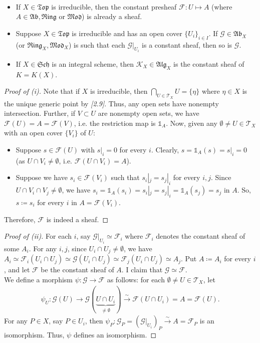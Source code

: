 \documentclass[11pt,a4paper,footinclude=true,headinclude=true]{scrbook} %
\newcommand{\FF}{\mathscr{F}}
\newcommand{\GG}{\mathscr{G}}
\newcommand{\KK}{\mathscr{K}}
\newcommand{\TT}{\mathcal{T}}
\newcommand{\Sch}{\mathfrak{Sch}}
\newcommand{\Ab}{\mathfrak{Ab}}
\newcommand{\Ring}{\mathfrak{Ring}}
\newcommand{\Top}{\mathfrak{Top}}
\newcommand{\<}{\langle}
\newcommand{\>}{\rangle}
\newcommand{\isoto}{\overset{\sim}{\to}}
\newcommand{\isolongto}{\overset{\sim}{\longrightarrow}}
\newcommand{\MOD}{\mathfrak{Mod}}
\newcommand{\ALG}{\mathfrak{Alg}}
\newenvironment{proposition}[2][]
{\renewcommand\theinnercustomprop{#2}\innercustomprop[#1] 
\begin{mdframed}[backgroundcolor=gray!20]\ }
{\end{mdframed}\endinnercustomprop}
\begin{document}
\begin{proposition}{6.C}
    \begin{itemize}
        \item[(i)] If $X\in\Top$ is irreducible, then the constant presheaf $\FF:U\mapsto A$ (where $A\in\Ab,\Ring$ or $\MOD$) is already a sheaf.
        \item[(ii)] Suppose $X\in\Top$ is irreducible and has an open cover $\{U_i\}_{i\in I}$. If $\GG\in\Ab_X$ (or $\Ring_X,\MOD_X$) is such that each $\GG|_{U_i}$ is a constant sheaf, then so is $\GG$.
        \item[(iii)] If $X\in\Sch$ is an integral scheme, then $\KK_X\in\ALG_X$ is the constant sheaf of $K=K(X)$. 
    \end{itemize}
\end{proposition}
\begin{proof}[Proof of (i)]
    Note that if $X$ is irreducible, then $\bigcap_{U\in\TT_X}U=\{\eta\}$ where $\eta\in X$ is the unique generic point by \textit{[2.9]}. Thus, any open sets have nonempty intersection. Further, if $V\subset U$ are nonempty open sets, we have $\FF(U)=A=\FF(V)$, i.e. the restriction map is $\mathds{1}_A$. Now, given any $\emptyset\neq U\in\TT_X$ with an open cover $\{V_i\}$ of $U$:
    \begin{itemize}
        \item[(S3)] Suppose $s\in\FF(U)$ with $s|_i=0$ for every $i$. Clearly, $s=\mathds{1}_A(s)=s|_i=0$ (as $U\cap V_i\neq\emptyset$, i.e. $\FF(U\cap V_i)=A$).
        \item[(S4)] Suppose we have $s_i\in\FF(V_i)$ such that $s_i|_j=s_j|_i$ for every $i,j$. Since $U\cap V_i\cap V_j\neq\emptyset$, we have $s_i=\mathds{1}_A(s_i)=s_i|_j=s_j|_i=\mathds{1}_A(s_j)=s_j$ in $A$. So, $s\coloneqq s_i$ for every $i$ in $A=\FF(V_i)$.
    \end{itemize}
    Therefore, $\FF$ is indeed a sheaf.
\end{proof}
\begin{proof}[Proof of (ii)]
    For each $i$, say $\GG|_{U_i}\simeq\FF_i$ where $\FF_i$ denotes the constant sheaf of some $A_i$. For any $i,j$, since $U_i\cap U_j\neq\emptyset$, we have $A_i\simeq\FF_i(U_i\cap U_j)\simeq\GG(U_i\cap U_j)\simeq\FF_j(U_i\cap U_j)\simeq A_j$. Put $A\coloneqq A_i$ for every $i$, and let $\FF$ be the constant sheaf of $A$. I claim that $\GG\simeq\FF$.\\
    
    We define a morphism $\psi:\GG\to\FF$ as follows: for each $\emptyset\neq U\in\TT_X$, let
    \begin{align*}
        \psi_U:\GG(U)\to\GG(\underbrace{U\cap U_i}_{\neq\emptyset})\isolongto\FF(U\cap U_i)=A=\FF(U).
    \end{align*}
    For any $P\in X$, say $P\in U_i$, then $\psi_P:\GG_P=(\GG|_{U_i})_P\isoto A=\FF_P$ is an isomorphism. Thus, $\psi$ defines an isomorphism.
\end{proof}
\end{document}
